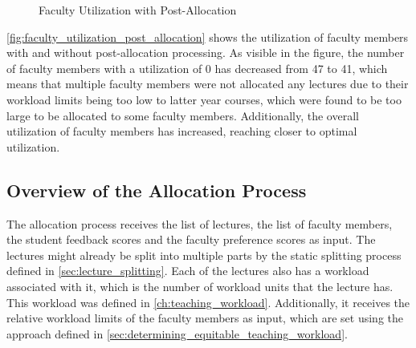 \begin{figure}[H]
  \centering
  \caption{Faculty Utilization with Post-Allocation}
  \label{fig:faculty_utilization_post_allocation}
\end{figure}

\autoref{fig:faculty_utilization_post_allocation} shows the utilization of faculty members with and without post-allocation processing. As visible in the figure, the number of faculty members with a utilization of 0 has decreased from 47 to 41, which means that multiple faculty members were not allocated any lectures due to their workload limits being too low to latter year courses, which were found to be too large to be allocated to some faculty members. Additionally, the overall utilization of faculty members has increased, reaching closer to optimal utilization.

\subsection{Overview of the Allocation Process}
\label{sec:allocation_process}

The allocation process receives the list of lectures, the list of faculty members, the student feedback scores and the faculty preference scores as input. The lectures might already be split into multiple parts by the static splitting process defined in \autoref{sec:lecture_splitting}. Each of the lectures also has a workload associated with it, which is the number of workload units that the lecture has. This workload was defined in \autoref{ch:teaching_workload}. Additionally, it receives the relative workload limits of the faculty members as input, which are set using the approach defined in \autoref{sec:determining_equitable_teaching_workload}.

